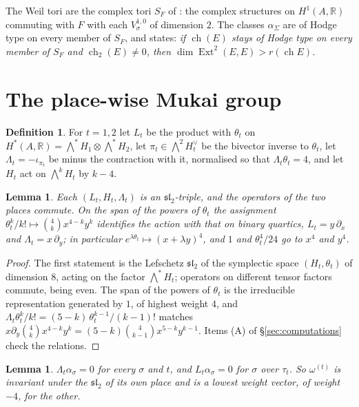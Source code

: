 \documentclass[11pt]{amsart}
\newtheorem{lemma}[theorem]{Lemma}
\theoremstyle{definition}
\newtheorem{definition}[theorem]{Definition}
\theoremstyle{remark}
\newcommand{\RR}{\mathbb{R}}
\newcommand{\ch}{\operatorname{ch}}
\newcommand{\Ext}{\operatorname{Ext}}
\begin{document}
The Weil tori are the complex tori $S_{F}$ of \cite[Setup~19.9]{BMB}: the
complex structures on $H^{1}(A,\RR)$ commuting with $F$ with each
$V_{\sigma}^{1,0}$ of dimension $2$. The classes $\alpha_{\Sigma}$ are of Hodge
type on every member of $S_{F}$, and \cite[Theorem~19.12]{BMB} states:
\emph{if $\ch(E)$ stays of Hodge type on every member of $S_{F}$ and
$\ch_{2}(E)\neq0$, then $\dim\Ext^{2}(E,E)>r(\ch E)$.}

\section{The place-wise Mukai group}\label{sec:group}

\begin{definition}\label{def:ops}
For $t=1,2$ let $L_{t}$ be the product with $\theta_{t}$ on
$H^{*}(A,\RR)=\bigwedge^{*}H_{1}\otimes\bigwedge^{*}H_{2}$, let
$\pi_{t}\in\bigwedge^{2}H_{t}^{\vee}$ be the bivector inverse to
$\theta_{t}$, let $\Lambda_{t}=-\iota_{\pi_{t}}$ be minus the contraction with
it, normalised so that $\Lambda_{t}\theta_{t}=4$, and let $H_{t}$ act on
$\bigwedge^{k}H_{t}$ by $k-4$.
\end{definition}

\begin{lemma}\label{lem:sl2}
Each $(L_{t},H_{t},\Lambda_{t})$ is an $\mathfrak{sl}_{2}$-triple, and the
operators of the two places commute. On the span of the powers of
$\theta_{t}$ the assignment
$\theta_{t}^{k}/k!\mapsto\binom{4}{k}x^{4-k}y^{k}$ identifies the action with
that on binary quartics, $L_{t}=y\,\partial_{x}$ and
$\Lambda_{t}=x\,\partial_{y}$; in particular $e^{\lambda\theta_{t}}\mapsto
(x+\lambda y)^{4}$, and $1$ and $\theta_{t}^{4}/24$ go to $x^{4}$ and
$y^{4}$.
\end{lemma}

\begin{proof}
The first statement is the Lefschetz $\mathfrak{sl}_{2}$ of the symplectic
space $(H_{t},\theta_{t})$ of dimension $8$, acting on the factor
$\bigwedge^{*}H_{t}$; operators on different tensor factors commute, being
even. The span of the powers of $\theta_{t}$ is the irreducible
representation generated by $1$, of highest weight $4$, and
$\Lambda_{t}\theta_{t}^{k}/k!=(5-k)\,\theta_{t}^{k-1}/(k-1)!$ matches
$x\partial_{y}\binom{4}{k}x^{4-k}y^{k}=(5-k)\binom{4}{k-1}x^{5-k}y^{k-1}$.
Items (A) of \S\ref{sec:computations} check the relations.
\end{proof}

\begin{lemma}\label{lem:weil}
$\Lambda_{t}\alpha_{\sigma}=0$ for every $\sigma$ and $t$, and
$L_{t}\alpha_{\sigma}=0$ for $\sigma$ over $\tau_{t}$. So $\omega^{(t)}$ is
invariant under the $\mathfrak{sl}_{2}$ of its own place and is a lowest
weight vector, of weight $-4$, for the other.
\end{lemma}
\end{document}
